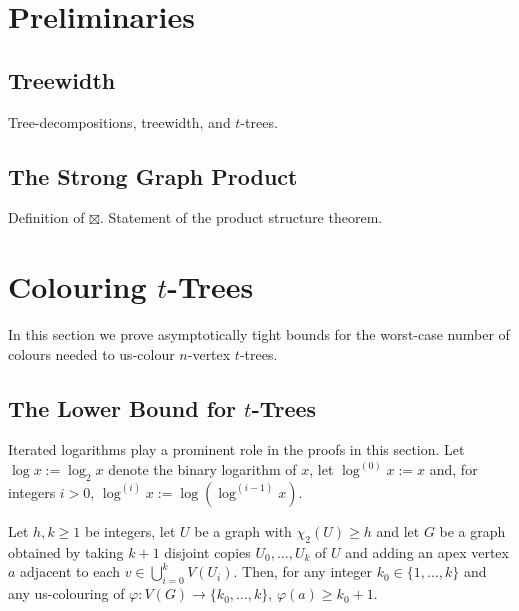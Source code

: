 \documentclass[kpfonts]{patmorin}
\newcommand{\uqs}{\chi_2}
\newcommand{\hus}{\hat{\chi}_2}
\begin{document}
%
%
%

\section{Preliminaries}

\subsection{Treewidth}

Tree-decompositions, treewidth, and $t$-trees.

\subsection{The Strong Graph Product}

Definition of $\boxtimes$.  Statement of the product structure theorem.



\section{Colouring $t$-Trees}

In this section we prove asymptotically tight bounds for the worst-case number of colours needed to us-colour $n$-vertex $t$-trees.

\subsection{The Lower Bound for $t$-Trees}

Iterated logarithms play a prominent role in the proofs in this section.  Let $\log x:=\log_2 x$ denote the binary logarithm of $x$, let $\log^{(0)} x := x$ and, for integers $i>0$, $\log^{(i)} x := \log(\log^{(i-1)} x)$.

\begin{lem}\label{apex-graph}
    Let $h,k\ge 1$ be integers, let $U$ be a graph with $\uqs(U)\ge h$ and let $G$ be a graph obtained by taking $k+1$ disjoint copies $U_0,\ldots,U_k$ of $U$ and adding an apex vertex $a$ adjacent to each $v\in\bigcup_{i=0}^k V(U_i)$.  Then, for any integer $k_0\in \{1,\ldots,k\}$ and any us-colouring of $\varphi:V(G)\to\{k_0,\ldots,k\}$, $\varphi(a) \ge k_0+1$.
\end{lem}
\end{document}

